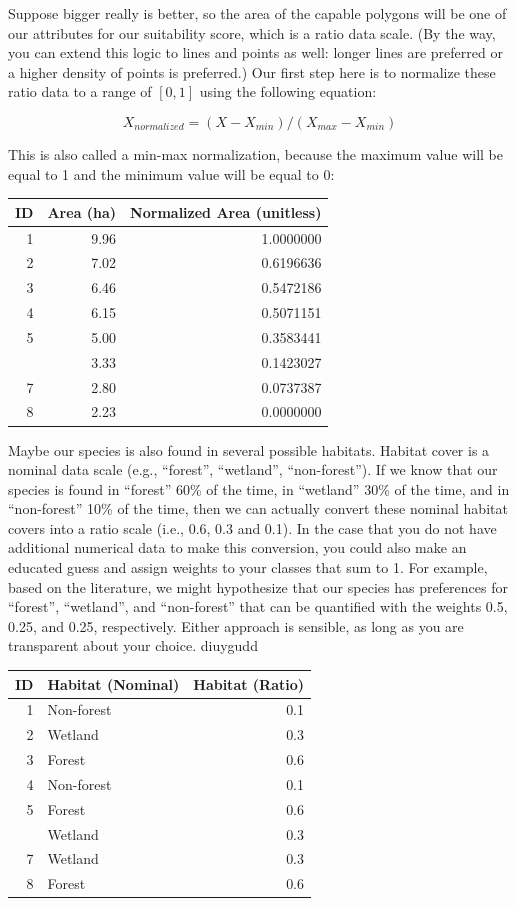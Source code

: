 \documentclass[
]{book}
\begin{document}
Suppose bigger really is better, so the area of the capable polygons will be one of our attributes for our suitability score, which is a ratio data scale. (By the way, you can extend this logic to lines and points as well: longer lines are preferred or a higher density of points is preferred.) Our first step here is to normalize these ratio data to a range of \([0,1]\) using the following equation:

\[
X_{normalized} = (X-X_{min})/(X_{max}-X_{min})
\]

This is also called a min-max normalization, because the maximum value will be equal to 1 and the minimum value will be equal to 0:

\begin{tabular}{rrr}
\toprule
ID & Area (ha) & Normalized Area (unitless)\\
\midrule
1 & 9.96 & 1.0000000\\
2 & 7.02 & 0.6196636\\
3 & 6.46 & 0.5472186\\
4 & 6.15 & 0.5071151\\
5 & 5.00 & 0.3583441\\
\addlinespace
6 & 3.33 & 0.1423027\\
7 & 2.80 & 0.0737387\\
8 & 2.23 & 0.0000000\\
\bottomrule
\end{tabular}

Maybe our species is also found in several possible habitats. Habitat cover is a nominal data scale (e.g., ``forest'', ``wetland'', ``non-forest''). If we know that our species is found in ``forest'' 60\% of the time, in ``wetland'' 30\% of the time, and in ``non-forest'' 10\% of the time, then we can actually convert these nominal habitat covers into a ratio scale (i.e., 0.6, 0.3 and 0.1). In the case that you do not have additional numerical data to make this conversion, you could also make an educated guess and assign weights to your classes that sum to 1. For example, based on the literature, we might hypothesize that our species has preferences for ``forest'', ``wetland'', and ``non-forest'' that can be quantified with the weights 0.5, 0.25, and 0.25, respectively. Either approach is sensible, as long as you are transparent about your choice. diuygudd

\begin{tabular}{rlr}
\toprule
ID & Habitat (Nominal) & Habitat (Ratio)\\
\midrule
1 & Non-forest & 0.1\\
2 & Wetland & 0.3\\
3 & Forest & 0.6\\
4 & Non-forest & 0.1\\
5 & Forest & 0.6\\
\addlinespace
6 & Wetland & 0.3\\
7 & Wetland & 0.3\\
8 & Forest & 0.6\\
\bottomrule
\end{tabular}
\end{document}
